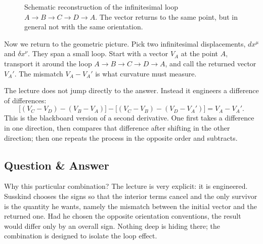 \begin{figure}[htbp]
\centering
{}
\caption{Schematic reconstruction of the infinitesimal loop \(A\to B\to C\to D\to A\). The vector returns to the same point, but in general not with the same orientation.}
\end{figure}

Now we return to the geometric picture. Pick two infinitesimal displacements, \(dx^\mu\) and \(\delta x^\nu\). They span a small loop. Start with a vector \(V_A\) at the point \(A\), transport it around the loop \(A\to B\to C\to D\to A\), and call the returned vector \(V_A'\). The mismatch \(V_A-V_A'\) is what curvature must measure.

The lecture does not jump directly to the answer. Instead it engineers a difference of differences:
\begin{equation}
\big[(V_C-V_D)-(V_B-V_A)\big]
-
\big[(V_C-V_B)-(V_D-V_A')\big]
=
V_A - V_A'.
\end{equation}
This is the blackboard version of a second derivative. One first takes a difference in one direction, then compares that difference after shifting in the other direction; then one repeats the process in the opposite order and subtracts.

\subsection{Question \& Answer}

Why this particular combination? The lecture is very explicit: it is engineered. Susskind chooses the signs so that the interior terms cancel and the only survivor is the quantity he wants, namely the mismatch between the initial vector and the returned one. Had he chosen the opposite orientation conventions, the result would differ only by an overall sign. Nothing deep is hiding there; the combination is designed to isolate the loop effect.

